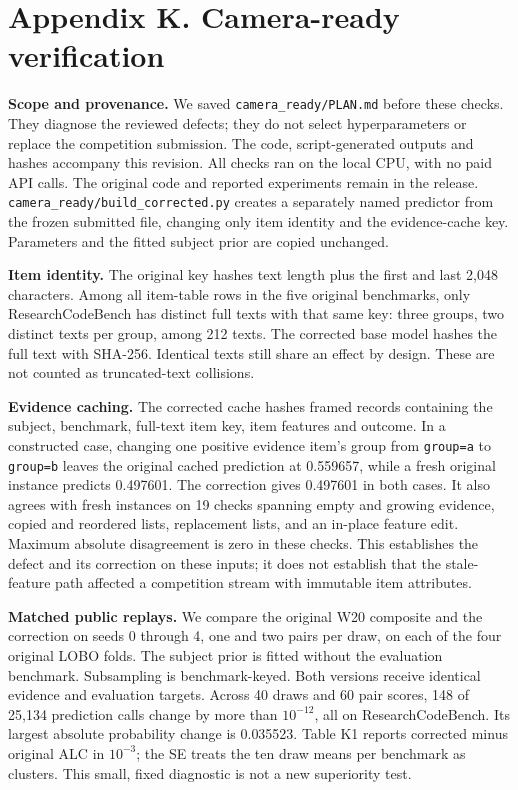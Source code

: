 \documentclass[
]{article}
\begin{document}
\section{Appendix K. Camera-ready
verification}\label{appendix-k.-camera-ready-verification}

\textbf{Scope and provenance.} We saved \texttt{camera\_ready/PLAN.md}
before these checks. They diagnose the reviewed defects; they do not
select hyperparameters or replace the competition submission. The code,
script-generated outputs and hashes accompany this revision. All checks
ran on the local CPU, with no paid API calls. The original code and
reported experiments remain in the release.
\texttt{camera\_ready/build\_corrected.py} creates a separately named
predictor from the frozen submitted file, changing only item identity
and the evidence-cache key. Parameters and the fitted subject prior are
copied unchanged.

\textbf{Item identity.} The original key hashes text length plus the
first and last 2,048 characters. Among all item-table rows in the five
original benchmarks, only ResearchCodeBench has distinct full texts with
that same key: three groups, two distinct texts per group, among 212
texts. The corrected base model hashes the full text with SHA-256.
Identical texts still share an effect by design. These are not counted
as truncated-text collisions.

\textbf{Evidence caching.} The corrected cache hashes framed records
containing the subject, benchmark, full-text item key, item features and
outcome. In a constructed case, changing one positive evidence item's
group from \texttt{group=a} to \texttt{group=b} leaves the original
cached prediction at 0.559657, while a fresh original instance predicts
0.497601. The correction gives 0.497601 in both cases. It also agrees
with fresh instances on 19 checks spanning empty and growing evidence,
copied and reordered lists, replacement lists, and an in-place feature
edit. Maximum absolute disagreement is zero in these checks. This
establishes the defect and its correction on these inputs; it does not
establish that the stale-feature path affected a competition stream with
immutable item attributes.

\textbf{Matched public replays.} We compare the original W20 composite
and the correction on seeds 0 through 4, one and two pairs per draw, on
each of the four original LOBO folds. The subject prior is fitted
without the evaluation benchmark. Subsampling is benchmark-keyed. Both
versions receive identical evidence and evaluation targets. Across 40
draws and 60 pair scores, 148 of 25,134 prediction calls change by more
than \(10^{-12}\), all on ResearchCodeBench. Its largest absolute
probability change is 0.035523. Table K1 reports corrected minus
original ALC in \(10^{-3}\); the SE treats the ten draw means per
benchmark as clusters. This small, fixed diagnostic is not a new
superiority test.
\end{document}
